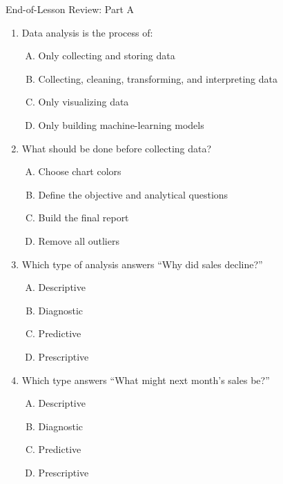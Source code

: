 \documentclass[aspectratio=169,11pt]{beamer}
\begin{document}
\begin{frame}{End-of-Lesson Review: Part A}
\begin{enumerate}\scriptsize
  \item Data analysis is the process of:
  \begin{enumerate}[A.]\scriptsize
    \item Only collecting and storing data
    \item Collecting, cleaning, transforming, and interpreting data
    \item Only visualizing data
    \item Only building machine-learning models
  \end{enumerate}
  \item What should be done before collecting data?
  \begin{enumerate}[A.]\scriptsize
    \item Choose chart colors
    \item Define the objective and analytical questions
    \item Build the final report
    \item Remove all outliers
  \end{enumerate}
  \item Which type of analysis answers ``Why did sales decline?''
  \begin{enumerate}[A.]\scriptsize
    \item Descriptive \item Diagnostic \item Predictive \item Prescriptive
  \end{enumerate}
  \item Which type answers ``What might next month's sales be?''
  \begin{enumerate}[A.]\scriptsize
    \item Descriptive \item Diagnostic \item Predictive \item Prescriptive
  \end{enumerate}
\end{enumerate}
\end{frame}
\end{document}
